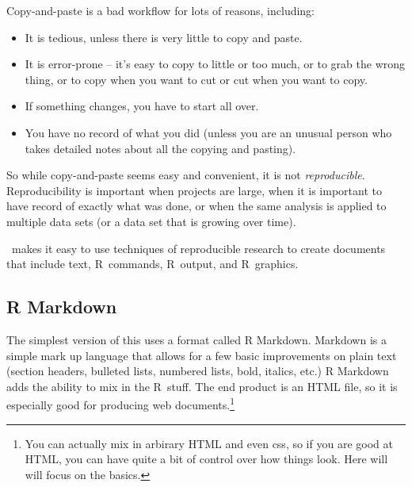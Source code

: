 \documentclass[twoside]{book}\usepackage[]{graphicx}\usepackage[]{xcolor}
\def\R{{\sf R}}
\begin{document}
Copy-and-paste is a bad workflow for lots of reasons, including:
\begin{itemize}
	\item It is tedious, unless there is very little to copy and paste.
	\item It is error-prone -- it's easy to copy to little or too much, or to grab the wrong thing,
		or to copy when you want to cut or cut when you want to copy.
	\item
		If something changes, you have to start all over.
	\item
		You have no record of what you did (unless you are an unusual person who
		takes detailed notes about all the copying and pasting).
\end{itemize}
So while copy-and-paste seems easy and convenient, it is not \emph{reproducible}.
Reproducibility is important when projects are large, when it is important to have record of 
exactly what was done, or when the same analysis is applied to multiple data sets (or a data set
that is growing over time).

\RStudio\ makes it easy to use techniques of reproducible research to create
documents that include text, \R\ commands, \R\ output, and \R\ graphics.  

\subsection{R Markdown}
The simplest version of this uses a format called R Markdown.  Markdown is a simple
mark up language that allows for a few basic improvements on plain text
(section headers, bulleted lists, numbered lists, bold, italics, etc.)  R
Markdown adds the ability to mix in the \R\ stuff.  
The end product is an HTML file, so it is especially good for producing web 
documents.\footnote{You can actually mix in arbirary HTML and even css, so if you
are good at HTML, you can have quite a bit of control over how things look.  Here will
will focus on the basics.}
\end{document}
